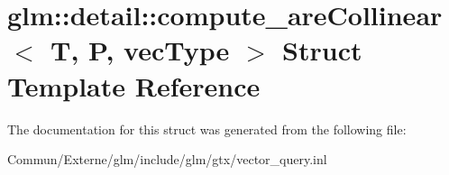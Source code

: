 \hypertarget{structglm_1_1detail_1_1compute__are_collinear}{}\section{glm\+:\+:detail\+:\+:compute\+\_\+are\+Collinear$<$ T, P, vec\+Type $>$ Struct Template Reference}
\label{structglm_1_1detail_1_1compute__are_collinear}


The documentation for this struct was generated from the following file\+:\begin{DoxyCompactItemize}
\item 
Commun/\+Externe/glm/include/glm/gtx/vector\+\_\+query.\+inl\end{DoxyCompactItemize}
